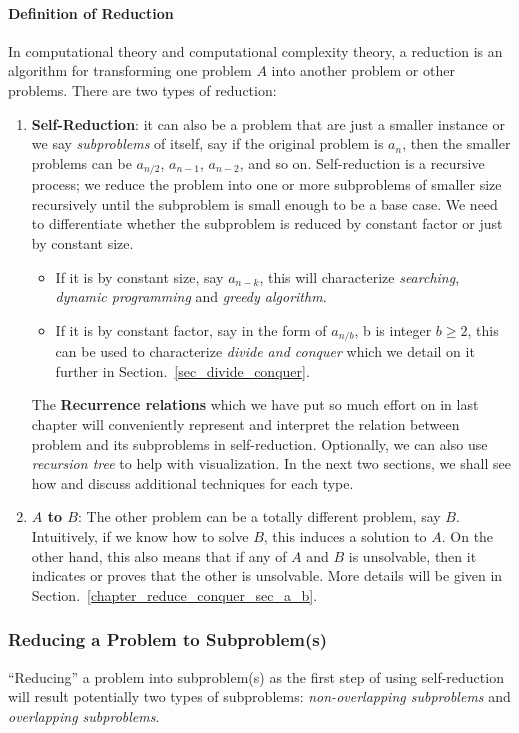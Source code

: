 \documentclass[../main.tex]{subfiles}
\begin{document}
\paragraph{Definition of Reduction} In computational theory and computational complexity theory, a reduction is an algorithm for transforming one problem $A$ into another problem or other problems. There are two types of reduction:
\begin{enumerate}

    \item \textbf{Self-Reduction}: it can also be a problem that are just a smaller instance or we say \textit{subproblems} of itself, say if the original problem is $a_n$, then the smaller problems can be $a_{n/2}$, $a_{n-1}$, $a_{n-2}$, and so on. Self-reduction is a recursive process; we reduce the problem into one or more subproblems of smaller size recursively until the subproblem is small enough to be a base case. We need to differentiate whether the subproblem is reduced by constant factor or just by constant size.
\begin{itemize}
    \item If it is by constant size,  say $a_{n-k}$, this will characterize \textit{searching},  \textit{dynamic programming} and \textit{greedy algorithm}. 
    \item If it is by constant factor,  say in the form of $a_{n/b}$, b is integer $b\geq 2$, this can be used to characterize  \textit{divide and conquer} which we detail on it further in Section.~\ref{sec_divide_conquer}.

\end{itemize}
 The \textbf{Recurrence relations} which we have put so much effort on in last chapter will conveniently represent and interpret the relation  between problem and its subproblems in self-reduction. Optionally, we can also use \textit{recursion tree} to help with visualization. In the next two sections, we shall see how and discuss additional techniques for each type. 
    \item \textbf{$A$ to $B$}: The other problem can be a totally different problem, say $B$. Intuitively, if we know how to solve $B$, this induces a solution to $A$. On the other hand, this also means that if any of $A$ and $B$ is unsolvable, then it indicates or proves that the other is unsolvable. More details will be given in Section.~\ref{chapter_reduce_conquer_sec_a_b}.
\end{enumerate}

\subsubsection{Reducing a Problem to Subproblem(s)} ``Reducing'' a problem into subproblem(s) as the first step of using self-reduction will result potentially two types of subproblems: \textit{non-overlapping subproblems} and \textit{overlapping subproblems}. 
\end{document}
